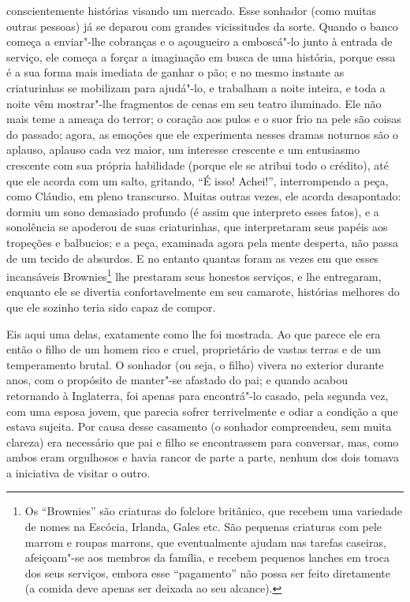 conscientemente histórias visando um mercado.  Esse sonhador (como
muitas outras pessoas) já se deparou com grandes vicissitudes da sorte.
 Quando o banco começa a enviar"-lhe cobranças e o açougueiro a
emboscá"-lo junto à entrada de serviço, ele começa a forçar a imaginação
em busca de uma história, porque essa é a sua forma mais imediata de
ganhar o pão; e no mesmo instante as criaturinhas se mobilizam para
ajudá"-lo, e trabalham a noite inteira, e toda a noite vêm mostrar"-lhe
fragmentos de cenas em seu teatro iluminado.  Ele não mais teme a
ameaça do terror; o coração aos pulos e o suor frio na pele são coisas
do passado; agora, as emoções que ele experimenta nesses dramas
noturnos são o aplauso, aplauso cada vez maior, um interesse crescente
e um entusiasmo crescente com sua própria habilidade (porque ele se
atribui todo o crédito), até que ele acorda com um salto, gritando, “É
isso!  Achei!”, interrompendo a peça, como Cláudio, em pleno
transcurso.  Muitas outras vezes, ele acorda desapontado: dormiu um
sono demasiado profundo (é assim que interpreto esses fatos), e a
sonolência se apoderou de suas criaturinhas, que interpretaram seus
papéis aos tropeções e balbucios; e a peça, examinada agora pela mente
desperta, não passa de um tecido de absurdos.  E no entanto quantas
foram as vezes em que esses incansáveis Brownies\footnote{ Os “Brownies”
são criaturas do folclore britânico, que
recebem uma variedade de nomes na Escócia, Irlanda, Gales etc. São pequenas
criaturas com pele marrom e roupas marrons, que eventualmente ajudam nas
tarefas caseiras, afeiçoam"-se aos membros da família, e recebem pequenos
lanches em troca dos seus serviços, embora esse “pagamento” não possa ser feito
diretamente (a comida deve apenas ser deixada ao seu alcance).} lhe prestaram seus
honestos serviços, e lhe entregaram, enquanto ele se divertia
confortavelmente em seu camarote, histórias melhores do que ele sozinho
teria sido capaz de compor. 

Eis aqui uma delas, exatamente como lhe foi mostrada.  Ao que parece ele
era então o filho de um homem rico e cruel, proprietário de vastas
terras e de um temperamento brutal.  O sonhador (ou seja, o filho)
vivera no exterior durante anos, com o propósito de manter"-se afastado
do pai; e quando acabou retornando à Inglaterra, foi apenas para
encontrá"-lo casado, pela segunda vez, com uma esposa jovem, que parecia
sofrer terrivelmente e odiar a condição a que estava sujeita.  Por
causa desse casamento (o sonhador compreendeu, sem muita clareza) era
necessário que pai e filho se encontrassem para conversar, mas, como
ambos eram orgulhosos e havia rancor de parte a parte, nenhum dos dois
tomava a iniciativa de visitar o outro.

